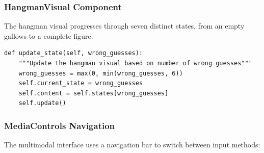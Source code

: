 \subsubsection*{HangmanVisual Component}

The hangman visual progresses through seven distinct states, from an empty gallows to a complete figure:

\begin{lstlisting}[style=pystyle, caption={Hangman Visual State Management}]
def update_state(self, wrong_guesses):
    """Update the hangman visual based on number of wrong guesses"""
    wrong_guesses = max(0, min(wrong_guesses, 6))
    self.current_state = wrong_guesses
    self.content = self.states[wrong_guesses]
    self.update()
\end{lstlisting}

\subsubsection*{MediaControls Navigation}

The multimodal interface uses a navigation bar to switch between input methods:
